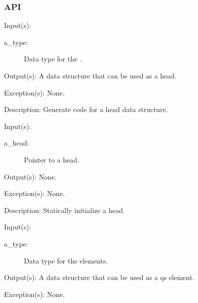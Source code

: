 \subsubsection{API}
\begin{capi}
\label{qs_head}
	\begin{capilist}
	\item[Input(s): ]
		\begin{description}\item[]
		\item[a\_type: ]
			Data type for the .
		\end{description}
	\item[Output(s): ]
		A data structure that can be used as a  head.
	\item[Exception(s): ] None.
	\item[Description: ]
		Generate code for a  head data structure.
	\end{capilist}
\label{qs_head_initializer}
	\begin{capilist}
	\item[Input(s): ]
		\begin{description}\item[]
		\item[a\_head: ]
			Pointer to a \classname{qs} head.
		\end{description}
	\item[Output(s): ] None.
	\item[Exception(s): ] None.
	\item[Description: ]
		Statically initialize a  head.
	\end{capilist}
\label{qs_elm}
	\begin{capilist}
	\item[Input(s): ]
		\begin{description}\item[]
		\item[a\_type: ]
			Data type for the  elements.
		\end{description}
	\item[Output(s): ]
		A data structure that can be used as a qs element.
	\item[Exception(s): ] None.

\end{capilist}
\end{capi}
